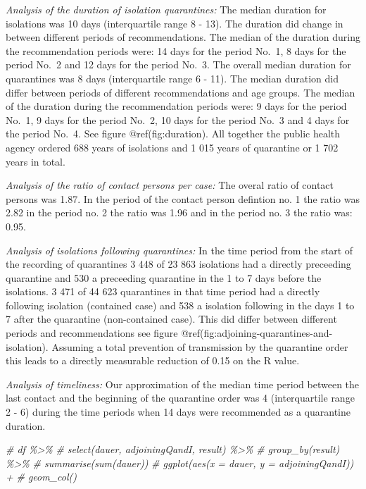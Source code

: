 \documentclass[
]{article}
\newenvironment{Shaded}{\begin{snugshade}}{\end{snugshade}}
\newcommand{\CommentTok}[1]{\textcolor[rgb]{0.56,0.35,0.01}{\textit{#1}}}
\begin{document}
\emph{Analysis of the duration of isolation quarantines:} The median
duration for isolations was 10 days (interquartile range 8 - 13). The
duration did change in between different periods of recommendations. The
median of the duration during the recommendation periods were: 14 days
for the period No.~1, 8 days for the period No.~2 and 12 days for the
period No.~3. The overall median duration for quarantines was 8 days
(interquartile range 6 - 11). The median duration did differ between
periods of different recommendations and age groups. The median of the
duration during the recommendation periods were: 9 days for the period
No.~1, 9 days for the period No.~2, 10 days for the period No.~3 and 4
days for the period No.~4. See figure @ref(fig:duration). All together
the public health agency ordered 688 years of isolations and 1 015 years
of quarantine or 1 702 years in total.

\emph{Analysis of the ratio of contact persons per case:} The overal
ratio of contact persons was 1.87. In the period of the contact person
defintion no. 1 the ratio was 2.82 in the period no. 2 the ratio was
1.96 and in the period no. 3 the ratio was: 0.95.

\emph{Analysis of isolations following quarantines:} In the time period
from the start of the recording of quarantines 3 448 of 23 863
isolations had a directly preceeding quarantine and 530 a preceeding
quarantine in the 1 to 7 days before the isolations. 3 471 of 44 623
quarantines in that time period had a directly following isolation
(contained case) and 538 a isolation following in the days 1 to 7 after
the quarantine (non-contained case). This did differ between different
periods and recommendations see figure
@ref(fig:adjoining-quarantines-and-isolation). Assuming a total
prevention of transmission by the quarantine order this leads to a
directly measurable reduction of 0.15 on the R value.

\emph{Analysis of timeliness:} Our approximation of the median time
period between the last contact and the beginning of the quarantine
order was 4 (interquartile range 2 - 6) during the time periods when 14
days were recommended as a quarantine duration.

\begin{Shaded}
\begin{Highlighting}[]
\CommentTok{\# df \%\textgreater{}\% }
\CommentTok{\#   select(dauer, adjoiningQandI, result) \%\textgreater{}\% }
\CommentTok{\#   group\_by(result) \%\textgreater{}\% }
\CommentTok{\#   summarise(sum(dauer))}
\CommentTok{\#   ggplot(aes(x = dauer, y = adjoiningQandI)) +}
\CommentTok{\#   geom\_col()}
\end{Highlighting}
\end{Shaded}
\end{document}
